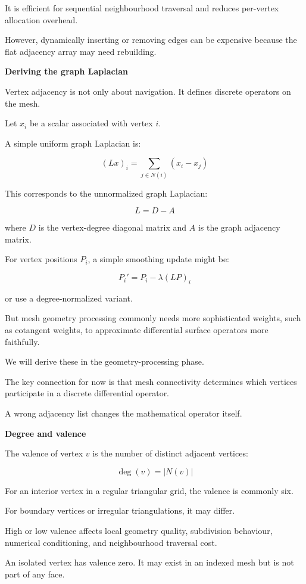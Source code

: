 It is efficient for sequential neighbourhood traversal and reduces per-vertex allocation overhead.

However, dynamically inserting or removing edges can be expensive because the flat adjacency array may need rebuilding.

\textbf{Deriving the graph Laplacian}

Vertex adjacency is not only about navigation. It defines discrete operators on the mesh.

Let \(x_i\) be a scalar associated with vertex \(i\).

A simple uniform graph Laplacian is:

\[
\boxed{ (Lx)_i=\sum_{j\in N(i)}(x_i-x_j) }
\]

This corresponds to the unnormalized graph Laplacian:

\[
L=D-A
\]

where \(D\) is the vertex-degree diagonal matrix and \(A\) is the graph adjacency matrix.

For vertex positions \(P_i\), a simple smoothing update might be:

\[
P_i'=P_i-\lambda(LP)_i
\]

or use a degree-normalized variant.

But mesh geometry processing commonly needs more sophisticated weights, such as cotangent weights, to approximate differential surface operators more faithfully.

We will derive these in the geometry-processing phase.

The key connection for now is that mesh connectivity determines which vertices participate in a discrete differential operator.

A wrong adjacency list changes the mathematical operator itself.

\textbf{Degree and valence}

The valence of vertex \(v\) is the number of distinct adjacent vertices:

\[
\boxed{\deg(v)=|N(v)|}
\]

For an interior vertex in a regular triangular grid, the valence is commonly six.

For boundary vertices or irregular triangulations, it may differ.

High or low valence affects local geometry quality, subdivision behaviour, numerical conditioning, and neighbourhood traversal cost.

An isolated vertex has valence zero. It may exist in an indexed mesh but is not part of any face.

